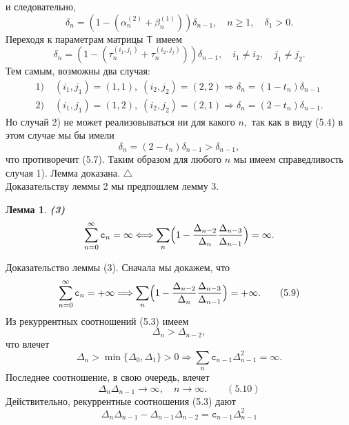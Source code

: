 \documentclass[12pt,a4paper]{article}
\theoremstyle{plain}   \newtheorem{Pro}{Задача}
\newtheorem{Lem}{Лемма}
\begin{document}
и следовательно,
\begin{equation*}
  \delta _n =(1-(\alpha _n ^{(2)} +\beta _n ^{(1)}))
    \delta _{n-1}, \quad n \geqslant 1,
	  \quad \delta _1 >0.
\end{equation*}
Переходя к параметрам матрицы
$ \mathsf{T}  $
имеем
\begin{equation*}
  \delta _n =(1-(\tau _n ^{(i_1 ,j_1 )}+
    \tau _n ^{(i_2 ,j_2 )})) \delta _{n-1},
	  \quad i_1 \not = i_2 ,
	    \quad j_1 \not = j_2 .
\end{equation*}
Тем самым, возможны два случая:
\begin{align*}
  1) & \; (i_1 , j_1 )=(1,1), \;
    (i_2 , j_2 )=(2,2) \Longrightarrow
	  \delta _n =(1-t_n )\delta _{n-1} \\
  2) & \; (i_1 , j_1 )=(1,2) , \;
    (i_2 , j_2 )=(2,1) \Longrightarrow
	  \delta _n =(2-t_n )\delta _{n-1}.
\end{align*}
Но случай 2) не может реализовываться ни для какого
$ n , $
так как в виду (5.4) в этом случае мы бы имели
$$
  \delta _n =(2-t_n )\delta _{n-1} > \delta _{n-1},
$$
что противоречит (5.7). Таким образом для любого
$ n $ мы имеем справедливость случая 1). Лемма доказана.
$ \triangle $ \\
Доказательству леммы 2 мы предпошлем лемму 3.
\begin{Lem}
{\bfseries (3)}
\begin{equation*}
  \sum _{n=0}^{\infty}\mathtt{c}_n =\infty
    \Longleftrightarrow \sum _n \Bigl (
	  1- \frac{\Delta _{n-2}}{\Delta _n}
	    \frac{\Delta _{n-3}}{\Delta _{n-1}}
		  \Bigr ) =\infty .
\end{equation*}
\end{Lem}
{\Large Доказательство леммы (3).}
Сначала мы докажем, что
\begin{equation*}
  \sum _{n=0}^{\infty}\mathtt{c}_n =+\infty
    \Longrightarrow \sum _n \Bigl (
	  1-\frac{\Delta _{n-2}}{\Delta _n}
	    \frac{\Delta _{n-3}}{\Delta _{n-1}}
		  \Bigr ) =+\infty .
		    \qquad (5.9)
\end{equation*}
Из рекуррентных соотношений (5.3) имеем
$$
  \Delta _n >\Delta _{n-2} ,
$$
что влечет
$$
  \Delta _n > \min \{ \Delta _0 , \Delta _1 \} >0
    \Longrightarrow \sum _n \mathtt{c}_{n-1}
	  \Delta _{n-1}^2 =\infty .
$$
Последнее соотношение, в свою очередь, влечет
$$
 \Delta _n \Delta _{n-1} \longrightarrow \infty ,
 \quad n \rightarrow \infty . \qquad (5.10)
$$
Действительно, рекуррентные соотношения (5.3) дают
$$
  \Delta _n \Delta _{n-1}-
    \Delta _{n-1} \Delta _{n-2} =
	  \mathtt{c}_{n-1}\Delta _{n-1}^2
$$
\end{document}
